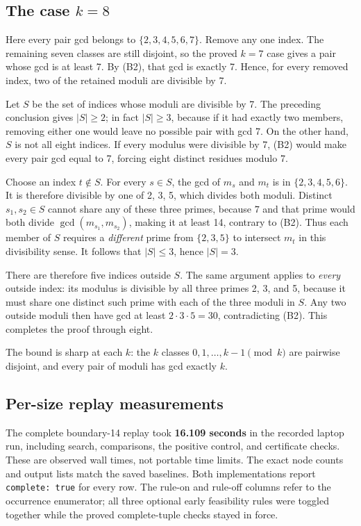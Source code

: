 \documentclass[11pt,a4paper]{article}
\begin{document}
\subsection{\texorpdfstring{The case \(k=8\)}{The case k=8}}\label{the-case-k8}

Here every pair gcd belongs to \(\{2,3,4,5,6,7\}\). Remove any one index. The remaining seven classes are still disjoint, so the proved \(k=7\) case gives a pair whose gcd is at least 7. By (B2), that gcd is exactly 7. Hence, for every removed index, two of the retained moduli are divisible by 7.

Let \(S\) be the set of indices whose moduli are divisible by 7. The preceding conclusion gives \(|S|\ge2\); in fact \(|S|\ge3\), because if it had exactly two members, removing either one would leave no possible pair with gcd 7. On the other hand, \(S\) is not all eight indices. If every modulus were divisible by 7, (B2) would make every pair gcd equal to 7, forcing eight distinct residues modulo 7.

Choose an index \(t\notin S\). For every \(s\in S\), the gcd of \(m_s\) and \(m_t\) is in \(\{2,3,4,5,6\}\). It is therefore divisible by one of 2, 3, 5, which divides both moduli. Distinct \(s_1,s_2\in S\) cannot share any of these three primes, because \(7\) and that prime would both divide \(\gcd(m_{s_1},m_{s_2})\), making it at least 14, contrary to (B2). Thus each member of \(S\) requires a \emph{different} prime from \(\{2,3,5\}\) to intersect \(m_t\) in this divisibility sense. It follows that \(|S|\le3\), hence \(|S|=3\).

There are therefore five indices outside \(S\). The same argument applies to \emph{every} outside index: its modulus is divisible by all three primes 2, 3, and 5, because it must share one distinct such prime with each of the three moduli in \(S\). Any two outside moduli then have gcd at least \(2\cdot3\cdot5=30\), contradicting (B2). This completes the proof through eight.

The bound is sharp at each \(k\): the \(k\) classes \(0,1,\ldots,k-1\pmod k\) are pairwise disjoint, and every pair of moduli has gcd exactly \(k\).

\subsection{Per-size replay measurements}\label{per-size-replay-measurements}

The complete boundary-14 replay took \textbf{16.109 seconds} in the recorded laptop run, including search, comparisons, the positive control, and certificate checks. These are observed wall times, not portable time limits. The exact node counts and output lists match the saved baselines. Both implementations report \texttt{complete:\ true} for every row. The rule-on and rule-off columns refer to the occurrence enumerator; all three optional early feasibility rules were toggled together while the proved complete-tuple checks stayed in force.
\end{document}
